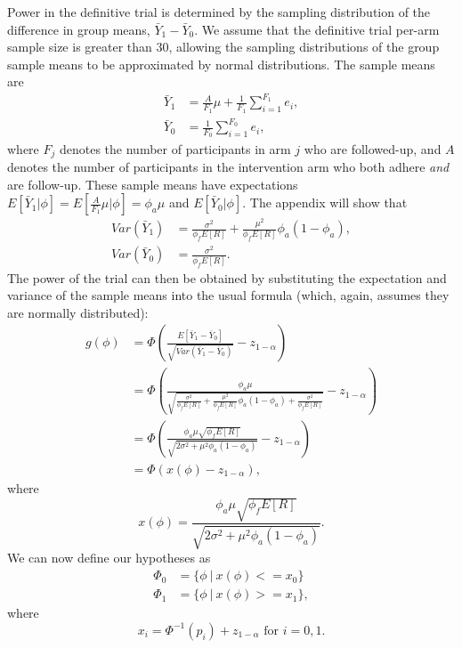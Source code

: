 \documentclass[AMA,STIX1COL]{WileyNJD-v2}
\begin{document}
Power in the definitive trial is determined by the sampling distribution of the difference in group means, $\bar{Y}_1 - \bar{Y}_0$. We assume that the definitive trial per-arm sample size is greater than 30, allowing the sampling distributions of the group sample means to be approximated by normal distributions. The sample means are
\begin{align*}
\bar{Y}_1 &= \frac{A}{F_1}\mu + \frac{1}{F_1} \sum_{i=1}^{F_1} e_i, \\
\bar{Y}_0 &= \frac{1}{F_0}\sum_{i=1}^{F_0} e_i,
\end{align*}
where $F_j$ denotes the number of participants in arm $j$ who are followed-up, and $A$ denotes the number of participants in the intervention arm who both adhere \emph{and} are follow-up. These sample means have expectations $E[\bar{Y}_1 | \phi] = E[\frac{A}{F_1}\mu | \phi] = \phi_a \mu$ and $E[\bar{Y}_0 | \phi]$. The appendix will show that
\begin{align}\label{eqn:vars}
Var(\bar{Y}_1) &= \frac{\sigma^2}{\phi_f E[R]} + \frac{\mu^2}{\phi_f E[R]} \phi_a (1-\phi_a), \\
Var(\bar{Y}_0) &= \frac{\sigma^2}{\phi_f E[R]}.
\end{align}
The power of the trial can then be obtained by substituting the expectation and variance of the sample means into the usual formula (which, again, assumes they are normally distributed):
\begin{align*}
g(\phi) &= \Phi \left(\frac{E[\bar{Y}_1 - \bar{Y}_0]}{\sqrt{Var(\bar{Y}_1 - \bar{Y}_0)}} - z_{1-\alpha} \right) \\
&= \Phi \left( \frac{\phi_a\mu}{\sqrt{ \frac{\sigma^2}{\phi_f E[R]} + \frac{\mu^2}{\phi_f E[R]} \phi_a (1-\phi_a) + \frac{\sigma^2}{\phi_f E[R]}} } - z_{1-\alpha} \right) \\
&= \Phi \left( \frac{ \phi_a\mu \sqrt{\phi_f E[R]} } {\sqrt{2\sigma^2 + \mu^2 \phi_a(1-\phi_a)}} - z_{1-\alpha} \right) \\
&= \Phi \left( x(\phi) - z_{1-\alpha} \right),
\end{align*}
where 
$$
x(\phi) =  \frac{ \phi_a\mu \sqrt{\phi_f E[R]} } {\sqrt{2\sigma^2 + \mu^2 \phi_a(1-\phi_a)}}.
$$
We can now define our hypotheses as
\begin{align*}
\Phi_0 &= \{\phi ~ | ~ x(\phi) <= x_0 \} \\
\Phi_1 &= \{\phi ~ | ~ x(\phi) >= x_1 \},
\end{align*}
where 
$$
x_i = \Phi^{-1}(p_i) + z_{1-\alpha} \text{ for } i = 0,1.
$$
\end{document}
